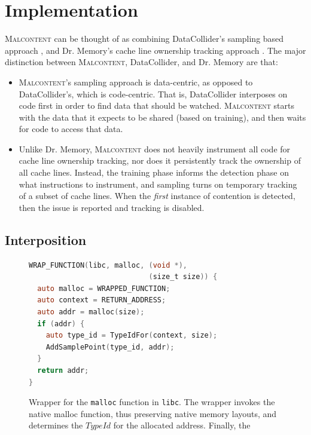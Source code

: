 \documentclass[letterpaper,twocolumn,10pt]{article}
\newcommand{\TextToolname}{Malcontent}
\newcommand{\Toolname}{\textsc{\TextToolname{}}}
\begin{document}


\section{Implementation}\label{sec:implementation}

\Toolname{} can be thought of as combining DataCollider's sampling based approach \cite{DataCollider}, and Dr. Memory's
cache line ownership tracking approach \cite{DrContention}. The major distinction between \Toolname, DataCollider, and
Dr. Memory are that:
\begin{itemize}
\item \Toolname's sampling approach is data-centric, as opposed to DataCollider's, which is code-centric. That is, DataCollider
interposes on code first in order to find data that should be watched. \Toolname{} starts with the data that it expects to
be shared (based on training), and then waits for code to access that data.

\item Unlike Dr. Memory, \Toolname{} does not heavily instrument all code for cache line ownership tracking, nor does it
persistently track the ownership of all cache lines. Instead, the training phase informs the detection phase on what
instructions to instrument, and sampling turns on temporary tracking of a subset of cache lines. When the \emph{first}
instance of contention is detected, then the issue is reported and tracking is disabled.
\end{itemize}

\subsection{Interposition}

\begin{figure}[t]
\begin{lstlisting}[language=C,basicstyle=\footnotesize\ttfamily]
WRAP_FUNCTION(libc, malloc, (void *),
                            (size_t size)) {
  auto malloc = WRAPPED_FUNCTION;
  auto context = RETURN_ADDRESS;
  auto addr = malloc(size);
  if (addr) {
    auto type_id = TypeIdFor(context, size);
    AddSamplePoint(type_id, addr);
  }
  return addr;
}
\end{lstlisting}
\caption{\label{fig:wrapper}Wrapper for the \texttt{malloc} function in \texttt{libc}. The wrapper invokes the native malloc %
function, thus preserving native memory layouts, and determines the $TypeId$ for the allocated address. Finally, the }
\end{figure}
\end{document}
